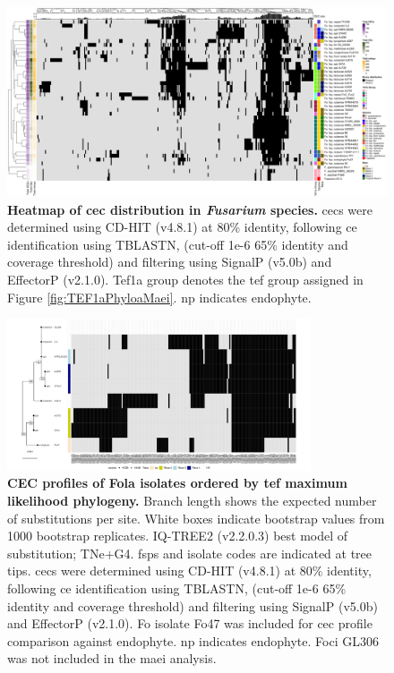 \begin{figure}
    \centering
    \includegraphics[width=\textwidth]{Figures/EffectorsHeatmap.png}
    \captionsetup{width=24cm}
    \caption[Heatmap of \acl{cec}s distribution in \textit{Fusarium} species.]{\textbf{Heatmap of \acf{cec} distribution in \textit{Fusarium} species.} \Acp{cec} were determined using CD-HIT (v4.8.1) at 80\% identity, following \ac{ce} identification using TBLASTN, (cut-off 1e-6 65\% identity and coverage threshold) and filtering using SignalP (v5.0b) and EffectorP (v2.1.0). Tef1a group denotes the \ac{tef} group assigned in Figure \ref{fig:TEF1aPhyloaMaei}. np indicates endophyte.}
    \label{fig:MaeiHeatmap}
\end{figure}

\begin{figure}
    \centering
    \includegraphics[width=0.8\textwidth]{Figures/HeatmapAndPhylo_ApiiAndCoriandriiOnly.png}
    \captionsetup{width=20cm}
    \caption[CEC profiles of \ac{Fola} isolates ordered by \ac{tef} maximum likelihood phylogeny.]{\textbf{CEC profiles of \ac{Fola} isolates ordered by \ac{tef} maximum likelihood phylogeny.} Branch length shows the expected number of substitutions per site. White boxes indicate bootstrap values from 1000 bootstrap replicates. IQ-TREE2 (v2.2.0.3) best model of substitution; TNe+G4. \Acfp{fsp} and isolate codes are indicated at tree tips. \Acp{cec} were determined using CD-HIT (v4.8.1) at 80\% identity, following \ac{ce} identification using TBLASTN, (cut-off 1e-6 65\% identity and coverage threshold) and filtering using SignalP (v5.0b) and EffectorP (v2.1.0). \ac{Fo} isolate Fo47 was included for \ac{cec} profile comparison against endophyte. np indicates endophyte. \ac{Foci} GL306 was not included in the \ac{maei} analysis.}
    \label{fig:Maei_celeryandcoriander}
\end{figure}


